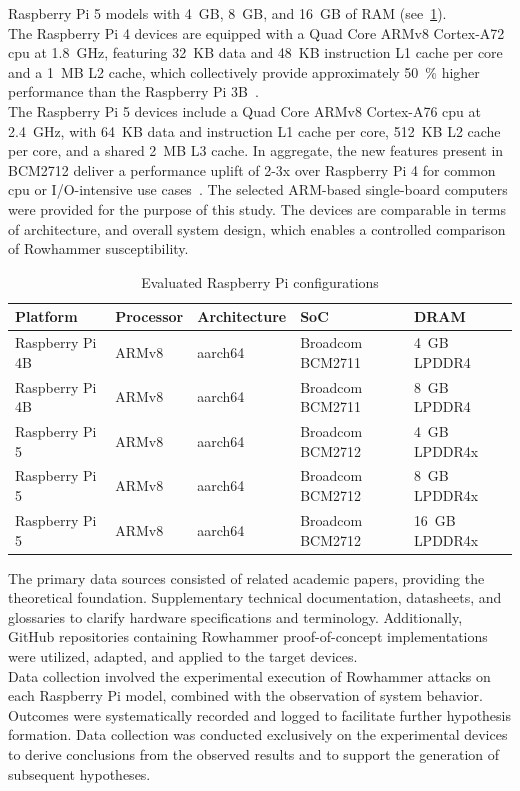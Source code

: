     Raspberry Pi 5 models with 4~GB, 8~GB, and 16~GB of RAM (see~\cref{tab:experimental-setups}). 
    \\
    The Raspberry Pi 4 devices are equipped 
    with a Quad Core ARMv8 Cortex-A72 \gls{cpu} at 1.8~GHz, featuring 32~KB data and 48~KB instruction L1 
    cache per core and a 1~MB L2 cache, which collectively provide approximately 50~\% higher performance 
    than the Raspberry Pi 3B~\cite{webProcessors}. 
    \\
    The Raspberry Pi 5 devices include a Quad Core ARMv8 Cortex-A76 \gls{cpu} 
    at 2.4~GHz, with 64~KB data and instruction L1 cache per core, 512~KB L2 cache per core, and a 
    shared 2~MB L3 cache. In aggregate, the new features present in BCM2712 deliver a performance 
    uplift of 2-3x over Raspberry Pi 4 for common \gls{cpu} or I/O-intensive use cases~\cite{webProcessors}.
    The selected ARM-based single-board computers were provided for the purpose of this study.
    The devices are comparable in terms of architecture, and overall system design, which 
    enables a controlled comparison of Rowhammer susceptibility.

    \begin{table}[h!]
      \centering
      \caption{Evaluated Raspberry Pi configurations}
      \label{tab:experimental-setups}
      \begin{tabular}{|l|l|l|l|l|}
        \hline
        \textbf{Platform} & \textbf{Processor} & \textbf{Architecture} & \textbf{SoC} & \textbf{DRAM} \\ \hline
        Raspberry Pi 4B & ARMv8 & aarch64 & Broadcom BCM2711 & 4~GB LPDDR4 \\ \hline
        Raspberry Pi 4B & ARMv8 & aarch64 & Broadcom BCM2711 & 8~GB LPDDR4 \\ \hline
        Raspberry Pi 5 & ARMv8 & aarch64 & Broadcom BCM2712 & 4~GB LPDDR4x \\ \hline
        Raspberry Pi 5 & ARMv8 & aarch64 & Broadcom BCM2712 & 8~GB LPDDR4x \\ \hline
        Raspberry Pi 5 & ARMv8 & aarch64 & Broadcom BCM2712 & 16~GB LPDDR4x \\ \hline
      \end{tabular}
    \end{table}

    The primary data sources consisted of related academic papers, 
    providing the theoretical foundation. Supplementary 
    technical documentation, datasheets, and glossaries to clarify hardware specifications 
    and terminology. Additionally, GitHub repositories containing Rowhammer 
    proof-of-concept implementations were utilized, adapted, and applied to 
    the target devices.
    \\
    Data collection involved the experimental execution of Rowhammer attacks on each 
    Raspberry Pi model, combined with the observation of system behavior. Outcomes 
    were systematically recorded and logged to facilitate further hypothesis formation. 
    Data collection was conducted exclusively on the experimental devices to derive 
    conclusions from the observed results and to support the generation of subsequent 
    hypotheses.

